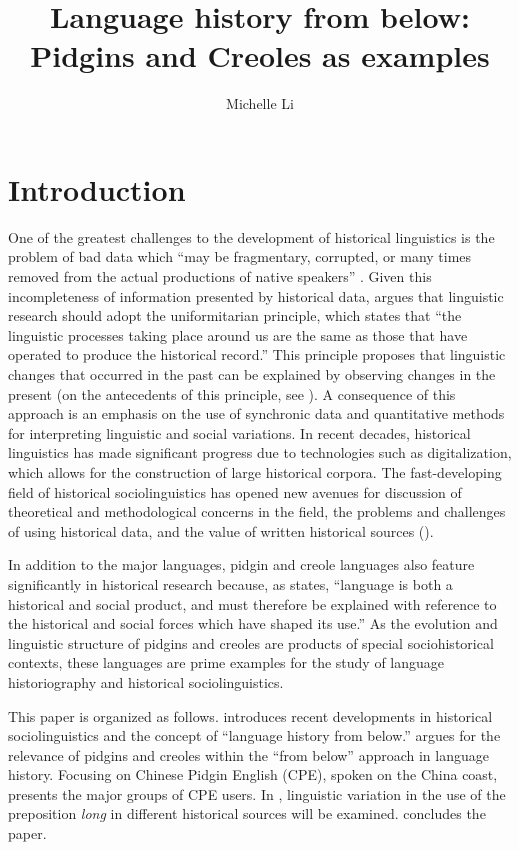 \documentclass[english,output=paper,colorlinks,citecolor=brown]{../langscibook}
\author{Michelle Li\affiliation{Caritas Institute of Higher Education, Hong Kong}\orcid{}}
\title{Language history from below: Pidgins and Creoles as examples}
\begin{document}
\maketitle

\section{Introduction} 
One of the greatest challenges to the development of historical linguistics is the problem of bad data which “may be fragmentary, corrupted, or many times removed from the actual productions of native speakers” \citep[100]{Labov1972}. Given this incompleteness of information presented by historical data, \citet[101]{Labov1972} argues that linguistic research should adopt the uniformitarian principle, which states that “the linguistic processes taking place around us are the same as those that have operated to produce the historical record.” This principle proposes that linguistic changes that occurred in the past can be explained by observing changes in the present (on the antecedents of this principle, see \citealt{Christy1983}). A consequence of this approach is an emphasis on the use of synchronic data and quantitative methods for interpreting linguistic and social variations. In recent decades, historical linguistics has made significant progress due to technologies such as digitalization, which allows for the construction of large historical corpora. The fast-developing field of historical sociolinguistics has opened new avenues for discussion of theoretical and methodological concerns in the field, the problems and challenges of using historical data, and the value of written historical sources (\citealt{HernandezCampoyCondeSilvestre2012, Russi2016}).

In addition to the major languages, pidgin and creole languages also feature significantly in historical research because, as \citet[1696]{Romaine2005} states, “language is both a historical and social product, and must therefore be explained with reference to the historical and social forces which have shaped its use.” As the evolution and linguistic structure of pidgins and creoles are products of special sociohistorical contexts, these languages are prime examples for the study of language historiography and historical sociolinguistics. 

This paper is organized as follows.  introduces recent developments in historical sociolinguistics and the concept of “language history from below.”  argues for the relevance of pidgins and creoles within the “from below” approach in language history. Focusing on Chinese Pidgin English (CPE), spoken on the China coast,  presents the major groups of CPE users. In , linguistic variation in the use of the preposition \textit{long} in different historical sources will be examined.  concludes the paper.
\end{document}
